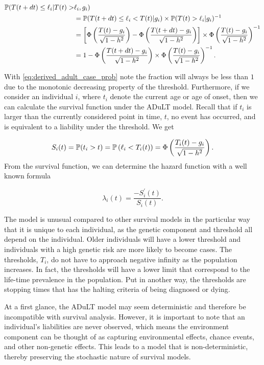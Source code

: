 \begin{align}
	\mathbb{P}(T(t + dt) \leq \ell_i | T(t) >& \ell_i, g_i)  \\
	&=\mathbb{P}(T(t + dt) \leq \ell_i < T(t)|g_i) \times \mathbb{P}(T(t) > \ell_i | g_i)^{-1}  \\
	&=
	\left[\Phi\left( \dfrac{T(t) - g_i}{\sqrt{1 - h^2}}\right) - \Phi\left( \dfrac{T(t + dt) - g_i}{\sqrt{1 - h^2}}\right)\right] \times
	\Phi \left( \dfrac{T(t) - g_i}{\sqrt{1 - h^2}}\right)^{-1} \\
	&=
	1 - \Phi\left( \dfrac{T(t + dt) - g_i}{\sqrt{1 - h^2}}\right) \times \Phi\left( \dfrac{T(t) - g_i}{\sqrt{1 - h^2}}\right)^{-1} \label{eq:derived_adult_case_prob}.
\end{align}

With \cref{eq:derived_adult_case_prob} note the fraction will always be less than $ 1 $ due to the monotonic decreasing property of the threshold. Furthermore, if we consider an individual $ i $, where $ t_i $ denote the current age or age of onset, then we can calculate the survival function under the ADuLT model. Recall that if $ t_i $ is larger than the currently considered point in time, $ t $, no event has occurred, and is equivalent to a liability under the threshold. We get


\begin{equation}
S_i(t) = \mathbb{P}(t_i > t) = \mathbb{P} \left(\ell_i < T_i(t) \right) = \Phi\left(\dfrac{T_i(t) - g_i}{\sqrt{1 - h^2}}\right).
\end{equation}
From the survival function, we can determine the hazard function with a well known formula 

\begin{equation}
\lambda_i(t) = \dfrac{-S_i^{'}(t)}{S_i(t)}.
\end{equation}

The model is unusual compared to other survival models in the particular way that it is unique to each individual, as the genetic component and threshold all depend on the individual. Older individuals will have a lower threshold and individuals with a high genetic risk are more likely to become cases. The thresholds, $ T_i $, do not have to approach negative infinity as the population increases. In fact, the thresholds will have a lower limit that correspond to the life-time prevalence in the population. Put in another way, the thresholds are stopping times that has the halting criteria of being diagnosed or dying.

At a first glance, the ADuLT model may seem deterministic and therefore be incompatible with survival analysis. However, it is important to note that an individual's liabilities are never observed, which means the environment component can be thought of as capturing environmental effects, chance events, and other non-genetic effects. This leads to a model that is non-deterministic, thereby preserving the stochastic nature of survival models.
